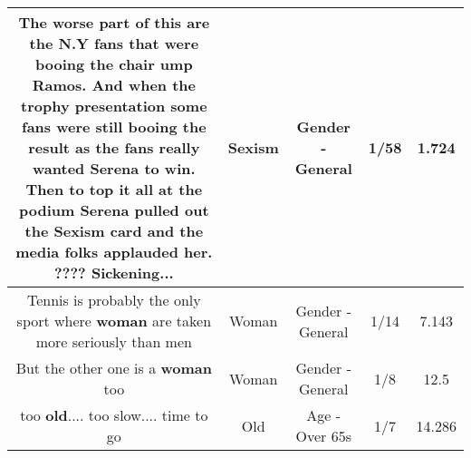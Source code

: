 \documentclass[11pt]{article}
\newlength\mylength
\begin{document}
\begin{center}
\begin{longtable}{|C{.65\mylength}|C{.30\mylength}|C{.12\mylength}|C{.12\mylength}|C{.12\mylength}|}
  \small The worse part of this are the N.Y fans that  were booing the chair ump Ramos. And when the trophy presentation some fans were still booing the result as the fans really wanted Serena to win. Then to top it all at the podium Serena pulled out the \textbf{Sexism} card and  the media folks applauded her. ????  Sickening...\normalsize   & Sexism & Gender - General & 1/58 & 1.724 \\  \hline
  \small Tennis is probably the only sport where \textbf{woman} are taken more seriously than men\normalsize   & Woman & Gender - General & 1/14 & 7.143 \\  \hline
  \small But the other one is a \textbf{woman} too\normalsize   & Woman & Gender - General & 1/8 & 12.5 \\  \hline
  \small too \textbf{old}.... too slow.... time to go\normalsize   & Old & Age - Over 65s & 1/7 & 14.286 \\  \hline

\end{longtable}
\end{center}
\end{document}
